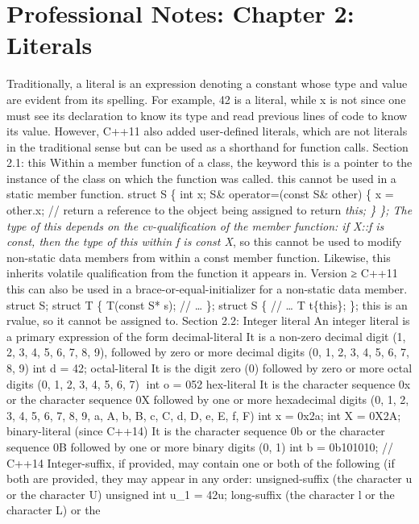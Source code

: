 \hypertarget{professional-notes-chapter-2-literals}{%
\chapter{Professional Notes: Chapter 2:
Literals}\label{professional-notes-chapter-2-literals}}

Traditionally, a literal is an expression denoting a constant whose type
and value are evident from its spelling. For example, 42 is a literal,
while x is not since one must see its declaration to know its type and
read previous lines of code to know its value. However, C++11 also added
user-deﬁned literals, which are not literals in the traditional sense
but can be used as a shorthand for function calls. Section 2.1: this
Within a member function of a class, the keyword this is a pointer to
the instance of the class on which the function was called. this cannot
be used in a static member function. struct S \{ int x; S\&
operator=(const S\& other) \{ x = other.x; // return a reference to the
object being assigned to return \emph{this; \} \}; The type of this
depends on the cv-qualiﬁcation of the member function: if X::f is const,
then the type of this within f is const X}, so this cannot be used to
modify non-static data members from within a const member function.
Likewise, this inherits volatile qualiﬁcation from the function it
appears in. Version ≥ C++11 this can also be used in a
brace-or-equal-initializer for a non-static data member. struct S;
struct T \{ T(const S* s); // \ldots{} \}; struct S \{ // \ldots{} T
t\{this\}; \}; this is an rvalue, so it cannot be assigned to. Section
2.2: Integer literal An integer literal is a primary expression of the
form decimal-literal It is a non-zero decimal digit (1, 2, 3, 4, 5, 6,
7, 8, 9), followed by zero or more decimal digits (0, 1, 2, 3, 4, 5, 6,
7, 8, 9) int d = 42; octal-literal It is the digit zero (0) followed by
zero or more octal digits (0, 1, 2, 3, 4, 5, 6, 7) int o = 052
hex-literal It is the character sequence 0x or the character sequence 0X
followed by one or more hexadecimal digits (0, 1, 2, 3, 4, 5, 6, 7, 8,
9, a, A, b, B, c, C, d, D, e, E, f, F) int x = 0x2a; int X = 0X2A;
binary-literal (since C++14) It is the character sequence 0b or the
character sequence 0B followed by one or more binary digits (0, 1) int b
= 0b101010; // C++14 Integer-suﬃx, if provided, may contain one or both
of the following (if both are provided, they may appear in any order:
unsigned-suﬃx (the character u or the character U) unsigned int u\_1 =
42u; long-suﬃx (the character l or the character L) or the
